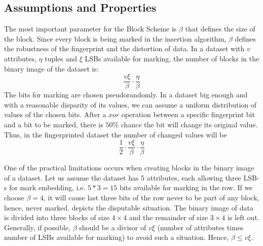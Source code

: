 \subsection{Assumptions and Properties}\label{subsec:assumptions-block}
The most important parameter for the Block Scheme is $\beta$ that defines the size of the block. 
Since every block is being marked in the insertion algorithm, $\beta$ defines the robustness of the fingerprint and the distortion of data. 
In a dataset with $v$ attributes, $\eta$ tuples and $\xi$ LSBs available for marking, the number of blocks in the binary image of the dataset is:
\begin{equation}
    \frac{v\xi}{\beta} \cdot \frac{\eta}{\beta}
\end{equation}
The bits for marking are chosen pseudorandomly. In a dataset big enough and with a reasonable disparity of its values, we can assume a uniform distribution of values of the chosen bits. After a $xor$ operation between a specific fingerprint bit and a bit to be marked, there is $50\%$ chance the bit will change its original value. 
Thus, in the fingerprinted dataset the number of changed values will be
\begin{equation}\label{eq:block-changes}
    \frac{1}{2} \cdot \frac{v\xi}{\beta} \cdot \frac{\eta}{\beta}
\end{equation}

One of the practical limitations occurs when creating blocks in the binary image of a dataset. 
Let us assume the dataset has 5 attributes, each allowing three LSB-s for mark embedding, i.e. $5*3=15$ bits available for marking in the row.
If we choose $\beta=4$, it will cause last three bits of the row never to be part of any block, hence, never marked. 
 depicts the disputable situation.
The binary image of data is divided into three blocks of size $4\times4$ and the remainder of size $3\times4$ is left out. 
Generally, if possible, $\beta$ should be a divisor of $v\xi$ (number of attributes times number of LSBs available for marking) to avoid such a situation.
Hence, $\beta \leq v \xi$.

